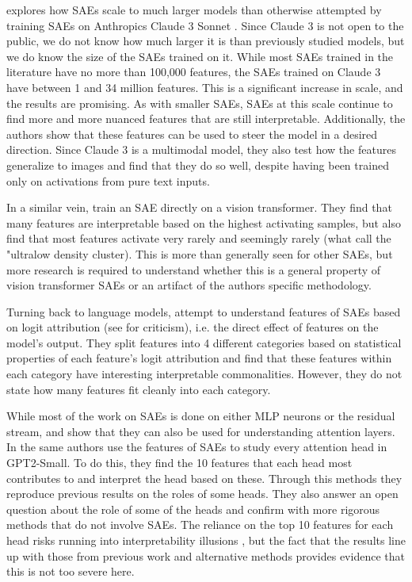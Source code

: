 \documentclass[../../main.tex]{subfiles}
\begin{document}
\citet{templeton_scaling_2024} explores how SAEs scale to much larger models than otherwise attempted by training SAEs on Anthropics Claude 3 Sonnet \citep{anthropic_introducing_2024}.
Since Claude 3 is not open to the public, we do not know how much larger it is than previously studied models, but we do know the size of the SAEs trained on it.
While most SAEs trained in the literature have no more than 100,000 features, the SAEs trained on Claude 3 have between 1 and 34 million features.
This is a significant increase in scale, and the results are promising.
As with smaller SAEs, SAEs at this scale continue to find more and more nuanced features that are still interpretable.
Additionally, the authors show that these features can be used to steer the model in a desired direction.
Since Claude 3 is a multimodal model, they also test how the features generalize to images and find that they do so well, despite having been trained only on activations from pure text inputs.

In a similar vein, \citet{hugofry_towards_2024} train an SAE directly on a vision transformer.
They find that many features are interpretable based on the highest activating samples, but also find that most features activate very rarely and seemingly rarely (what \cite{bricken_towards_2023} call the "ultralow density cluster).
This is more than generally seen for other SAEs, but more research is required to understand whether this is a general property of vision transformer SAEs or an artifact of the authors specific methodology.

Turning back to language models, \citet{bloom_understanding_2024} attempt to understand features of SAEs based on logit attribution \citep{nostalgebraist_interpreting_2020} (see \citet{dao_adversarial_2023} for criticism), i.e. the direct effect of features on the model's output.
They split features into 4 different categories based on statistical properties of each feature's logit attribution and find that these features within each category have interesting interpretable commonalities.
However, they do not state how many features fit cleanly into each category.

While most of the work on SAEs is done on either MLP neurons or the residual stream, \citet{kissane_sparse_2024} and \citet{kissane_attention_2024} show that they can also be used for understanding attention layers.
In \citet{krzyzanowski_we_2024} the same authors use the features of SAEs to study every attention head in GPT2-Small.
To do this, they find the 10 features that each head most contributes to and interpret the head based on these.
Through this methods they reproduce previous results on the roles of some heads.
They also answer an open question about the role of some of the heads and confirm with more rigorous methods that do not involve SAEs.
The reliance on the top 10 features for each head risks running into interpretability illusions \citep{bolukbasi_interpretability_2021}, but the fact that the results line up with those from previous work and alternative methods provides evidence that this is not too severe here. 
\end{document}
